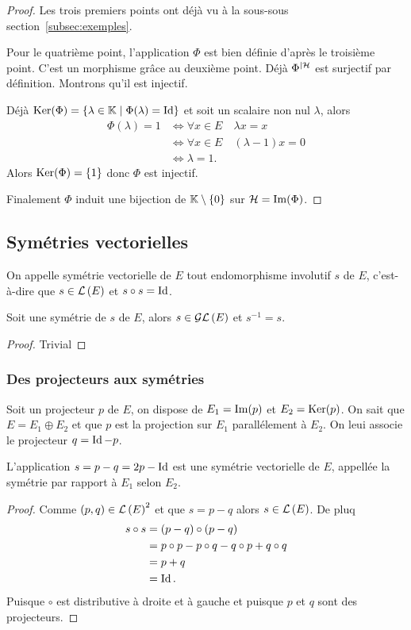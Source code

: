 \begin{proof}
  Les trois premiers points ont déjà vu à la sous-sous section~\ref{subsec:exemples}.

  Pour le quatrième point, l'application $\Phi$ est bien définie d'après le troisième point. C'est un morphisme grâce au deuxième point. Déjà $\Phi^{|\mathcal{H}}$ est surjectif par définition. Montrons qu'il est injectif.

Déjà $\operatorname{Ker}(\Phi)=\left\{\lambda \in \mathbb{K}\mathrel{}\middle|\mathrel{}\Phi(\lambda)=\operatorname{Id}\right\}$ et soit un scalaire non nul $\lambda$, alors
\begin{align}
  \Phi(\lambda) = 1 &\iff \forall x \in E \quad \lambda x=x\\
  &\iff \forall x \in E \quad (\lambda-1)x=0\\
  &\iff \lambda=1.
\end{align}
Alors  $\operatorname{Ker}(\Phi)=\{1\}$ donc $\Phi$ est injectif.

Finalement $\Phi$ induit une bijection de $\mathbb{K}\setminus\{0\}$ sur $\mathcal{H}=\operatorname{Im}(\Phi)$.
\end{proof}

\subsection{Symétries vectorielles}

\begin{defdef}
  On appelle symétrie vectorielle de $E$ tout endomorphisme involutif $s$ de $E$, c'est-à-dire que $s \in \mathcal{L}\left(E\right)$ et $s \circ s = \operatorname{Id}$.
\end{defdef}

\begin{prop}
  Soit une symétrie de $s$ de $E$, alors $s \in \mathcal{GL}\left(E\right)$ et $s^{-1}=s$.
\end{prop}
\begin{proof}
  Trivial
\end{proof}

\subsubsection{Des projecteurs aux symétries}

Soit un projecteur $p$ de $E$, on dispose de $E_1=\operatorname{Im}(p)$ et $E_2=\operatorname{Ker}(p)$. On sait que $E=E_1 \oplus E_2$ et que $p$ est la projection sur $E_1$ parallélement à $E_2$. On leui associe le projecteur $q=\operatorname{Id}-p$.

\begin{prop}
  L'application $s=p-q=2p-\operatorname{Id}$ est une symétrie vectorielle de $E$, appellée la symétrie par rapport à $E_1$ selon $E_2$.
\end{prop}
\begin{proof}
  Comme $(p,q) \in \mathcal{L}\left(E\right)^2$ et que $s=p-q$ alors $s \in \mathcal{L}\left(E\right)$. De pluq
  \begin{align}
    s \circ s &=(p-q) \circ (p-q)\\
    &=p \circ p -p \circ q -q \circ p +q \circ q\\
    &=p+q\\
    &=\operatorname{Id}.
  \end{align}
  Puisque $\circ$ est distributive à droite et à gauche et puisque $p$ et $q$ sont des projecteurs.
\end{proof}

